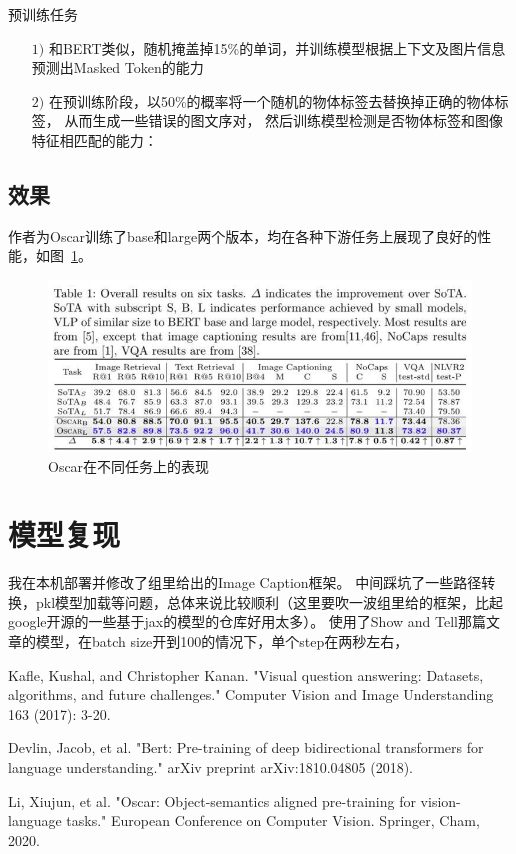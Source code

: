 \documentclass[UTF8]{ctexart}
\begin{document}
预训练任务
\begin{itemize}
    \item[$1)$] 和BERT类似，随机掩盖掉15\%的单词，并训练模型根据上下文及图片信息预测出Masked Token的能力
    \item[$2)$] 在预训练阶段，以50\%的概率将一个随机的物体标签去替换掉正确的物体标签， 从而生成一些错误的图文序对， 然后训练模型检测是否物体标签和图像特征相匹配的能力：
\end{itemize}

\subsection{效果}
作者为Oscar训练了base和large两个版本，均在各种下游任务上展现了良好的性能，如图~\ref{fig:3}。
\begin{figure}
    \centering
    \includegraphics[width=\textwidth]{oscar_performence}
    \caption{Oscar在不同任务上的表现}
    \label{fig:3}
\end{figure}

\section{模型复现}
我在本机部署并修改了组里给出的Image Caption框架。
中间踩坑了一些路径转换，pkl模型加载等问题，总体来说比较顺利（这里要吹一波组里给的框架，比起google开源的一些基于jax的模型的仓库好用太多）。
使用了Show and Tell那篇文章的模型，在batch size开到100的情况下，单个step在两秒左右，




\begin{thebibliography}{8}
    Kafle, Kushal, and Christopher Kanan.
    "Visual question answering: Datasets, algorithms, and future challenges."
    Computer Vision and Image Understanding 163 (2017): 3-20.

    Devlin, Jacob, et al. "Bert: Pre-training of deep bidirectional transformers for language understanding." arXiv preprint arXiv:1810.04805 (2018).

    Li, Xiujun, et al. "Oscar: Object-semantics aligned pre-training for vision-language tasks." European Conference on Computer Vision. Springer, Cham, 2020.

\end{thebibliography}
\end{document}
